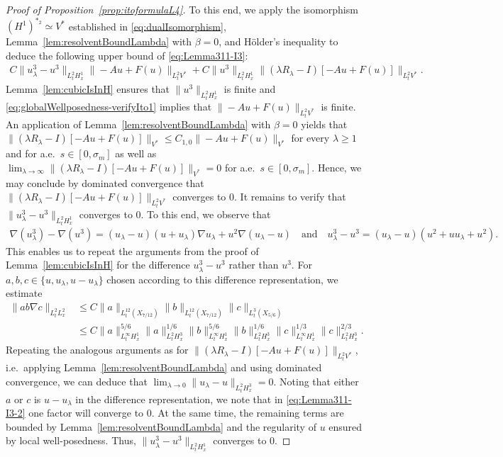 \documentclass[reqno]{amsart}
\newcommand{\1}{\mathbf{1}}
\newcommand{\grad}{\nabla}
\begin{document}
\begin{proof}[Proof of Proposition~\ref{prop:itoformulaL4}]
    
    To this end, we apply the isomorphism $(H^1)^{\ast_2}\simeq V^\ast$ established in \eqref{eq:dualIsomorphism}, Lemma~\ref{lem:resolventBoundLambda} with $\beta=0$, and Hölder's inequality to deduce the following upper bound of \eqref{eq:Lemma311-I3}:
\begin{align*}
 C \|u_\lambda^3-u^3\|_{L_t^2 H_x^1} \|-Au+ F(u)\|_{L^2_t V^\ast}
   + C \|u^3\|_{L_t^2H_x^1} \|(\lambda R_\lambda-I)[-Au+ F(u)]\|_{L^2_tV^\ast}.
\end{align*}
Lemma~\ref{lem:cubicIsInH} ensures that $\|u^3\|_{L_t^2H_x^1}$ is finite and \eqref{eq:globalWellposedness-verifyIto1} implies that $\|-Au+ F(u)\|_{L^2_t V^\ast}$ is finite. An application of Lemma~\ref{lem:resolventBoundLambda} with $\beta=0$ yields that $\|(\lambda R_\lambda-I)[-Au+ F(u)]\|_{V^*} \leq C_{1,0} \|-Au+ F(u)\|_{V^*}$ for every $\lambda\geq 1$ and for a.e.\ $s\in[0,\sigma_m]$ as well as $\lim_{\lambda \to\infty}\|(\lambda R_\lambda-I)[-Au+ F(u)]\|_{V^*} =0$ for a.e.\ $s\in[0,\sigma_m]$. Hence, we may conclude by dominated convergence that $\|(\lambda R_\lambda-I)[-Au+ F(u)]\|_{L^2_tV^\ast}$ converges to $0$. It remains to verify that $\|u_\lambda^3-u^3\|_{L_t^2 H_x^1} $ converges to $0$. To this end, we observe that
\begin{align*}
    \grad (u_\lambda^3)-\grad (u^3) = (u_\lambda-u)(u+u_\lambda)\grad u_\lambda + u^2\grad(u_\lambda-u)\quad\text{and}\quad
    u_\lambda^3-u^3 = (u_\lambda-u)(u^2+uu_\lambda+u^2).
\end{align*}
This enables us to repeat the arguments from the proof of Lemma~\ref{lem:cubicIsInH} for the difference $u_\lambda^3-u^3$ rather than $u^3$. For $a,b,c\in \{u,u_\lambda,u-u_\lambda\}$ chosen according to this difference representation, we estimate 
\begin{equation}\label{eq:Lemma311-I3-2}
\begin{aligned}
    \|ab\grad c\|_{L_t^2L_x^2} & \le C \|a\|_{L_t^{12}(X_{7/12})}\|b\|_{L_t^{12}(X_{7/12})}\|c\|_{L_t^{3}(X_{5/6})}  \\
    & \leq C \|a\|^{5/6}_{L_t^{\infty}H^1_x}\|a\|^{1/6}_{L_t^{2}H_x^3}
    \|b\|^{5/6}_{L_t^{\infty}H^1_x}\|b\|^{1/6}_{L_t^{2}H_x^3}
    \|c\|^{1/3}_{L_t^{\infty}H^1_x}\|c\|^{2/3}_{L_t^{2}H_x^3}.
    \end{aligned}
 \end{equation}
Repeating the analogous arguments as for $\|(\lambda R_\lambda-I)[-Au+ F(u)]\|_{L_t^2 V^*}$, i.e.\ applying Lemma~\ref{lem:resolventBoundLambda} and using dominated convergence, we can deduce that $\lim_{\lambda \to 0}\|u_\lambda - u\|_{L^2_t H_x^3}=0$. Noting that either $a$ or $c$ is $u-u_\lambda$ in the difference representation, we note that in \eqref{eq:Lemma311-I3-2} one factor will converge to $0$. At the same time, the remaining terms are bounded by Lemma~\ref{lem:resolventBoundLambda} and the regularity of $u$ ensured by local well-posedness. Thus, $\|u_\lambda^3-u^3\|_{L_t^2 H_x^1} $ converges to $0$. 


\end{proof}
\end{document}
